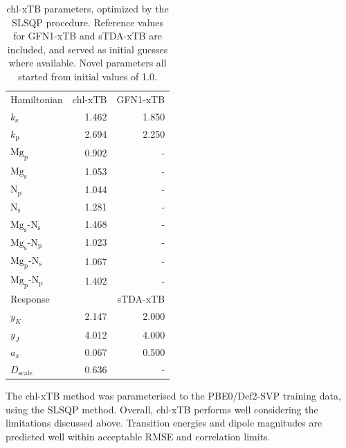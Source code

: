 \begin{table}
    \centering
    \begin{tabular}{|| l r | r ||}
    \hline
    Hamiltonian & chl-xTB & GFN1-xTB \\
    $k_\text{s}$ & 1.462 & 1.850 \\
    $k_\text{p}$ & 2.694 & 2.250 \\

    $\text{Mg}_\text{p}$ & 0.902 & - \\
    $\text{Mg}_\text{s}$ & 1.053 & - \\
    $\text{N}_\text{p}$ & 1.044 & - \\
    $\text{N}_\text{s}$ & 1.281 & - \\

    $\text{Mg}_\text{s}$-$\text{N}_\text{s}$ & 1.468 & - \\
    $\text{Mg}_\text{s}$-$\text{N}_\text{p}$ & 1.023 & - \\
    $\text{Mg}_\text{p}$-$\text{N}_\text{s}$ & 1.067 & - \\
    $\text{Mg}_\text{p}$-$\text{N}_\text{p}$ & 1.402 & - \\

    \hline\hline
    Response & & sTDA-xTB\\
    $y_K$ & 2.147 & 2.000 \\
    $y_J$ & 4.012 & 4.000 \\
    $a_x$ & 0.067 & 0.500 \\
    $D_{\text{scale}}$ & 0.636 & - \\
    \hline
    \end{tabular}
    \caption{chl-xTB parameters, optimized by the SLSQP procedure. Reference values
    for GFN1-xTB and sTDA-xTB are included, and served as initial guesses where 
    available. Novel parameters all started from initial values of 1.0.}
    \label{table:chl_params}
\end{table}

The chl-xTB method was parameterised to the PBE0/Def2-SVP training data, using the
SLSQP method. Overall, chl-xTB performs well considering the limitations discussed 
above. Transition energies and dipole magnitudes are predicted well within acceptable
RMSE and correlation limits.

